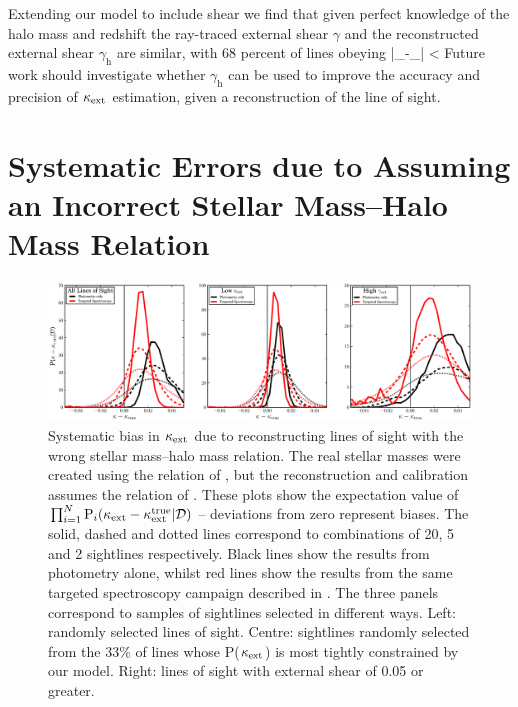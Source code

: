 \documentclass[useAMS,usenatbib,a4paper]{mn2e}
\begin{document}
Extending our model to include shear we find that given
perfect knowledge of the halo mass and redshift the ray-traced external shear
$\gamma$ and the reconstructed external shear $\gamma_{\mathrm{h}}$  are
similar, with 68 percent of lines obeying
\be
\label{eq:shearineq}
|{\pmb{\gamma}_{}-\pmb{\gamma}_{}}| < 
\ee 
Future work should investigate whether $\gamma_{\mathrm{h}}$ can be used
to improve the accuracy and precision of $\kappa_{\rm ext}$ estimation, given a
reconstruction of the line of sight. 


\section{Systematic Errors due to Assuming an Incorrect 
Stellar Mass--Halo Mass Relation}
\label{sec:SHAMfail}

\begin{figure}
\includegraphics[width=\textwidth]{figs/SHAMbias.eps}
\caption{Systematic bias in $\kappa_{\rm ext}$ due to reconstructing lines of sight with the wrong stellar mass--halo mass relation. The real stellar masses were created using the relation of \citet{MosterEtal2010}, but the reconstruction and calibration assumes the relation of \citet{BehrooziEtal2010}.  These plots
show the expectation value of $\prod_{i=1}^N {\rm P}_i(\kappa_{\rm ext}-\kappa_{\rm ext}^{\rm true}|{\mathcal{D}})$ --
deviations from zero represent biases. The solid, dashed and dotted lines
correspond to combinations of  20, 5 and 2 sightlines respectively. Black
lines show the results \infered from photometry alone, whilst red lines show
the results  from the same targeted spectroscopy campaign described in 
. The three panels correspond to samples of
sightlines selected in different ways. Left: randomly selected lines of
sight.  Centre: sightlines randomly selected from the 33\% of lines whose
P($\kappa_{\rm ext}$) is most tightly constrained by our model.  Right: lines of sight
with external shear of 0.05 or greater.}
\label{fig:SHAMbias}
\end{figure}
\end{document}
